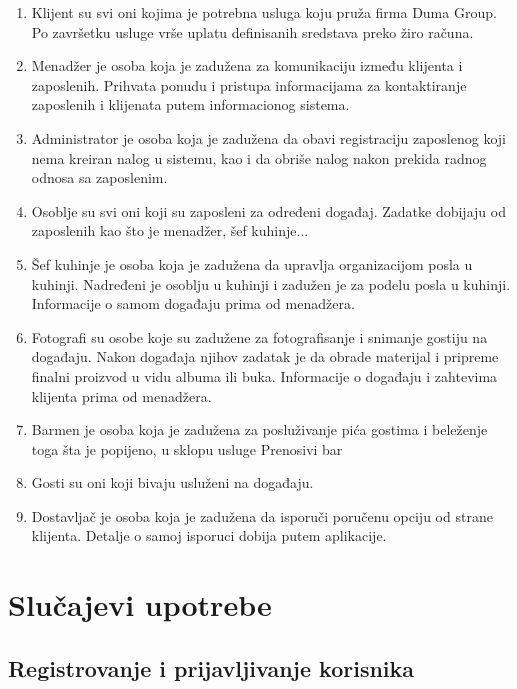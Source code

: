 \documentclass[a4paper]{article}
\begin{document}
    \begin{enumerate}
        \item Klijent su svi oni kojima je potrebna usluga koju pruža firma Duma Group. Po završetku usluge vrše uplatu definisanih sredstava preko žiro računa.
        \item Menadžer je osoba koja je zadužena za komunikaciju između klijenta i zaposlenih. Prihvata ponudu i pristupa informacijama za kontaktiranje zaposlenih i klijenata putem informacionog sistema.
        \item Administrator je osoba koja je zadužena da obavi registraciju zaposlenog koji nema kreiran nalog u sistemu, kao i da obriše nalog nakon prekida radnog odnosa sa zaposlenim.
        \item Osoblje su svi oni koji su zaposleni za određeni događaj. Zadatke dobijaju od zaposlenih kao što je menadžer, šef kuhinje...
        \item Šef kuhinje je osoba koja je zadužena da upravlja organizacijom posla u kuhinji. Nadređeni je osoblju u kuhinji i zadužen je za podelu posla u kuhinji. Informacije o samom događaju prima od menadžera.
        \item Fotografi su osobe koje su zadužene za fotografisanje i snimanje gostiju na događaju. Nakon događaja njihov zadatak je da obrade materijal i pripreme finalni proizvod u vidu albuma ili buka. Informacije o događaju i zahtevima klijenta prima od menadžera.
        \item Barmen je osoba koja je zadužena za posluživanje pića gostima i beleženje toga šta je popijeno, u sklopu usluge Prenosivi bar
        \item Gosti su oni koji bivaju usluženi na događaju.
        \item Dostavljač je osoba koja je zadužena da isporuči poručenu opciju od strane klijenta. Detalje o samoj isporuci dobija putem aplikacije.
    \end{enumerate}
    
    
\section{Slučajevi upotrebe}


\subsection{Registrovanje i prijavljivanje korisnika}
\end{document}
